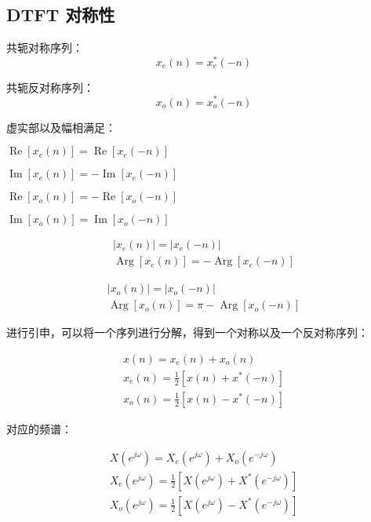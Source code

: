 \documentclass[cn,11pt,chinese,black,simple]{../elegantbook}
\begin{document}
\subsection{DTFT 对称性}

\begin{definition}[对称序列]
    共轭对称序列：\[x_e(n) = x_e^*(-n)\]

    共轭反对称序列：\[x_o(n) = x_o^*(-n)\]
\end{definition}

虚实部以及幅相满足：

$\operatorname{Re}\left[x_{e}(n)\right]=\operatorname{Re}\left[x_{e}(-n)\right]$


$\operatorname{Im}\left[x_{e}(n)\right]=-\operatorname{Im}\left[x_{e}(-n)\right] $ 


$\operatorname{Re}\left[x_{o}(n)\right]=-\operatorname{Re}\left[x_{o}(-n)\right]$

$\operatorname{Im}\left[x_{o}(n)\right]=\operatorname{Im}\left[x_{o}(-n)\right]$

\begin{equation}\begin{array}{l}
    \left|x_{e}(n)\right|=\left|x_{e}(-n)\right| \\
    \operatorname{Arg}\left[x_{e}(n)\right]=-\operatorname{Arg}\left[x_{e}(-n)\right]
\end{array}\end{equation}

\begin{equation}\begin{array}{l}
\left|x_{o}(n)\right|=\left|x_{o}(-n)\right| \\
\operatorname{Arg}\left[x_{o}(n)\right]=\pi-\operatorname{Arg}\left[x_{o}(-n)\right]
\end{array}\end{equation}

进行引申，可以将一个序列进行分解，得到一个对称以及一个反对称序列：

\begin{equation}\begin{array}{l}
    x(n)=x_{e}(n)+x_{o}(n) \\
    x_{e}(n)=\frac{1}{2}\left[x(n)+x^{*}(-n)\right] \\
    x_{o}(n)=\frac{1}{2}\left[x(n)-x^{*}(-n)\right]
\end{array}\end{equation}

对应的频谱：

\begin{equation}\begin{array}{l}
    X\left(e^{j \omega}\right)=X_{e}\left(e^{j \omega}\right)+X_{o}\left(e^{-j \omega}\right) \\
    X_{e}\left(e^{j \omega}\right)=\frac{1}{2}\left[X\left(e^{j \omega}\right)+X^{*}\left(e^{-j \omega}\right)\right] \\
    X_{o}\left(e^{j \omega}\right)=\frac{1}{2}\left[X\left(e^{j \omega}\right)-X^{*}\left(e^{-j \omega}\right)\right]
\end{array}\end{equation}
\end{document}
